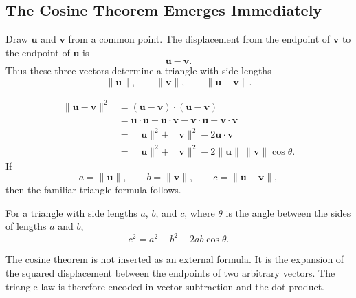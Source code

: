 \subsection{The Cosine Theorem Emerges Immediately}

Draw $\mathbf u$ and $\mathbf v$ from a common point. The displacement from the
endpoint of $\mathbf v$ to the endpoint of $\mathbf u$ is
\[
\mathbf u-\mathbf v.
\]
Thus these three vectors determine a triangle with side lengths
\[
\|\mathbf u\|,
\qquad
\|\mathbf v\|,
\qquad
\|\mathbf u-\mathbf v\|.
\]

\begin{derivationbox}
\[
\begin{aligned}
\|\mathbf u-\mathbf v\|^2
&=(\mathbf u-\mathbf v)\cdot(\mathbf u-\mathbf v)\\
&=\mathbf u\cdot\mathbf u
-\mathbf u\cdot\mathbf v
-\mathbf v\cdot\mathbf u
+\mathbf v\cdot\mathbf v\\
&=\|\mathbf u\|^2+\|\mathbf v\|^2-2\mathbf u\cdot\mathbf v\\
&=\|\mathbf u\|^2+\|\mathbf v\|^2
-2\|\mathbf u\|\,\|\mathbf v\|\cos\theta.
\end{aligned}
\]
If
\[
a=\|\mathbf u\|,
\qquad
b=\|\mathbf v\|,
\qquad
c=\|\mathbf u-\mathbf v\|,
\]
then the familiar triangle formula follows.
\end{derivationbox}

\begin{theorembox}
For a triangle with side lengths $a$, $b$, and $c$, where $\theta$ is the angle
between the sides of lengths $a$ and $b$,
\[
\boxed{c^2=a^2+b^2-2ab\cos\theta}.
\]
\end{theorembox}

\begin{interpretationbox}
The cosine theorem is not inserted as an external formula. It is the expansion
of the squared displacement between the endpoints of two arbitrary vectors.
The triangle law is therefore encoded in vector subtraction and the dot product.
\end{interpretationbox}

\begin{center}
\end{center}
